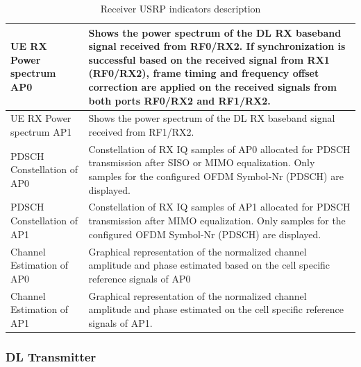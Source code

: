 \begin{landscape}
\begin{table}[]
\begin{tabular}{|l|p{14cm}|}
            UE RX Power spectrum AP0   & Shows the power spectrum of the DL RX baseband signal received from RF0/RX2.  If synchronization is successful based on the received signal from RX1 (RF0/RX2), frame timing and frequency offset correction are applied on the received signals from both ports RF0/RX2 and RF1/RX2. \\ \hline
            UE RX Power spectrum AP1   & Shows the power spectrum of the DL RX baseband signal received from RF1/RX2.                                                                                                                                                                                                          \\ \hline
            PDSCH Constellation of AP0 & Constellation of RX IQ samples of AP0 allocated for PDSCH transmission after SISO or MIMO equalization. Only samples for the configured OFDM Symbol-Nr (PDSCH) are displayed.                                                                                                         \\ \hline
            PDSCH Constellation of AP1 & Constellation of RX IQ samples of AP1 allocated for PDSCH transmission after MIMO equalization. Only samples for the configured OFDM Symbol-Nr (PDSCH) are displayed.                                                                                                                 \\ \hline
            Channel Estimation of AP0  & Graphical representation of the normalized channel amplitude and phase estimated based on the cell specific reference signals of AP0                                                                                                                                                  \\ \hline
            Channel Estimation of AP1  & Graphical representation of the normalized channel amplitude and phase estimated on the cell specific reference signals of AP1.                                                                                                                                                       \\ \hline
        \end{tabular}
        \caption{Receiver USRP indicators description}
        \label{tab:RXUSRPParamDesc}
    \end{table}
\end{landscape}

\subsubsection{DL Transmitter}\label{ssec:LTEAFWTXOptions}

